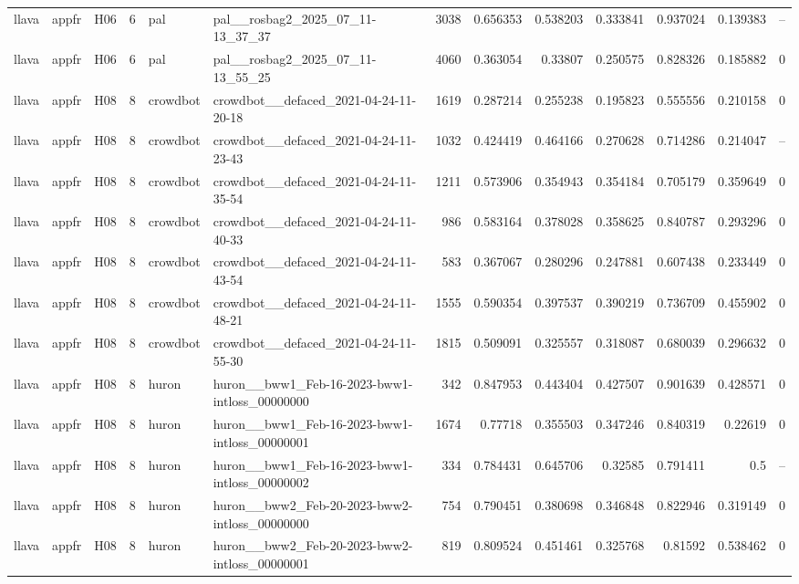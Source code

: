 \begin{longtable}{lllrllrrrrrrr}
llava & appfr & H06 & 6 & pal & pal\_\_rosbag2\_2025\_07\_11-13\_37\_37 & 3038 & 0.656353 & 0.538203 & 0.333841 & 0.937024 & 0.139383 & -- \\
llava & appfr & H06 & 6 & pal & pal\_\_rosbag2\_2025\_07\_11-13\_55\_25 & 4060 & 0.363054 & 0.33807 & 0.250575 & 0.828326 & 0.185882 & 0 \\
llava & appfr & H08 & 8 & crowdbot & crowdbot\_\_defaced\_2021-04-24-11-20-18 & 1619 & 0.287214 & 0.255238 & 0.195823 & 0.555556 & 0.210158 & 0 \\
llava & appfr & H08 & 8 & crowdbot & crowdbot\_\_defaced\_2021-04-24-11-23-43 & 1032 & 0.424419 & 0.464166 & 0.270628 & 0.714286 & 0.214047 & -- \\
llava & appfr & H08 & 8 & crowdbot & crowdbot\_\_defaced\_2021-04-24-11-35-54 & 1211 & 0.573906 & 0.354943 & 0.354184 & 0.705179 & 0.359649 & 0 \\
llava & appfr & H08 & 8 & crowdbot & crowdbot\_\_defaced\_2021-04-24-11-40-33 & 986 & 0.583164 & 0.378028 & 0.358625 & 0.840787 & 0.293296 & 0 \\
llava & appfr & H08 & 8 & crowdbot & crowdbot\_\_defaced\_2021-04-24-11-43-54 & 583 & 0.367067 & 0.280296 & 0.247881 & 0.607438 & 0.233449 & 0 \\
llava & appfr & H08 & 8 & crowdbot & crowdbot\_\_defaced\_2021-04-24-11-48-21 & 1555 & 0.590354 & 0.397537 & 0.390219 & 0.736709 & 0.455902 & 0 \\
llava & appfr & H08 & 8 & crowdbot & crowdbot\_\_defaced\_2021-04-24-11-55-30 & 1815 & 0.509091 & 0.325557 & 0.318087 & 0.680039 & 0.296632 & 0 \\
llava & appfr & H08 & 8 & huron & huron\_\_bww1\_Feb-16-2023-bww1-intloss\_00000000 & 342 & 0.847953 & 0.443404 & 0.427507 & 0.901639 & 0.428571 & 0 \\
llava & appfr & H08 & 8 & huron & huron\_\_bww1\_Feb-16-2023-bww1-intloss\_00000001 & 1674 & 0.77718 & 0.355503 & 0.347246 & 0.840319 & 0.22619 & 0 \\
llava & appfr & H08 & 8 & huron & huron\_\_bww1\_Feb-16-2023-bww1-intloss\_00000002 & 334 & 0.784431 & 0.645706 & 0.32585 & 0.791411 & 0.5 & -- \\
llava & appfr & H08 & 8 & huron & huron\_\_bww2\_Feb-20-2023-bww2-intloss\_00000000 & 754 & 0.790451 & 0.380698 & 0.346848 & 0.822946 & 0.319149 & 0 \\
llava & appfr & H08 & 8 & huron & huron\_\_bww2\_Feb-20-2023-bww2-intloss\_00000001 & 819 & 0.809524 & 0.451461 & 0.325768 & 0.81592 & 0.538462 & 0 \\

\end{longtable}
